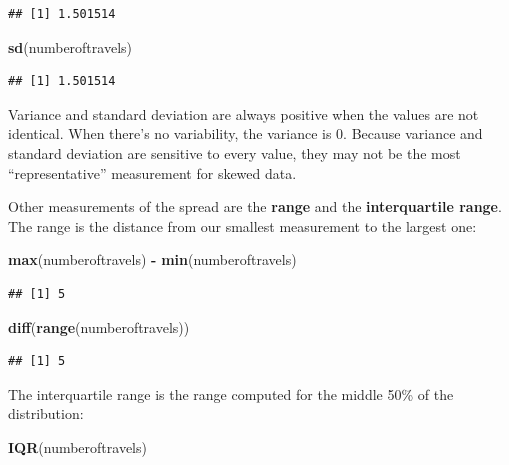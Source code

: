 \documentclass[]{article}
\newenvironment{Shaded}{\begin{snugshade}}{\end{snugshade}}
\newcommand{\KeywordTok}[1]{\textcolor[rgb]{0.13,0.29,0.53}{\textbf{#1}}}
\newcommand{\NormalTok}[1]{#1}
\newcommand{\OperatorTok}[1]{\textcolor[rgb]{0.81,0.36,0.00}{\textbf{#1}}}
\newcommand{\StringTok}[1]{\textcolor[rgb]{0.31,0.60,0.02}{#1}}
\begin{document}
\begin{verbatim}
## [1] 1.501514
\end{verbatim}

\begin{Shaded}
\begin{Highlighting}[]
\KeywordTok{sd}\NormalTok{(numberoftravels)}
\end{Highlighting}
\end{Shaded}

\begin{verbatim}
## [1] 1.501514
\end{verbatim}

Variance and standard deviation are always positive when the values are
not identical. When there's no variability, the variance is 0. Because
variance and standard deviation are sensitive to every value, they may
not be the most ``representative'' measurement for skewed data.

Other measurements of the spread are the \textbf{range} and the
\textbf{interquartile range}. The range is the distance from our
smallest measurement to the largest one:

\begin{Shaded}
\begin{Highlighting}[]
\KeywordTok{max}\NormalTok{(numberoftravels) }\OperatorTok{-}\StringTok{ }\KeywordTok{min}\NormalTok{(numberoftravels)}
\end{Highlighting}
\end{Shaded}

\begin{verbatim}
## [1] 5
\end{verbatim}

\begin{Shaded}
\begin{Highlighting}[]
\KeywordTok{diff}\NormalTok{(}\KeywordTok{range}\NormalTok{(numberoftravels))}
\end{Highlighting}
\end{Shaded}

\begin{verbatim}
## [1] 5
\end{verbatim}

The interquartile range is the range computed for the middle 50\% of the
distribution:

\begin{Shaded}
\begin{Highlighting}[]
\KeywordTok{IQR}\NormalTok{(numberoftravels)}
\end{Highlighting}
\end{Shaded}
\end{document}
